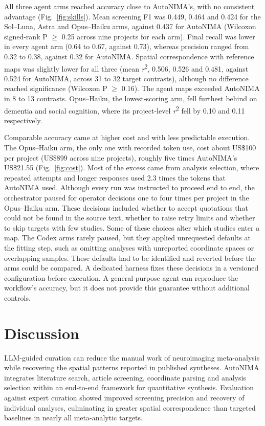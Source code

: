 All three agent arms reached accuracy close to AutoNIMA's, with no consistent advantage (Fig.~\ref{fig:skills}). Mean screening F1 was 0.449, 0.464 and 0.424 for the Sol--Luna, Astra and Opus--Haiku arms, against 0.437 for AutoNIMA (Wilcoxon signed-rank P $\geq$ 0.25 across nine projects for each arm). Final recall was lower in every agent arm (0.64 to 0.67, against 0.73), whereas precision ranged from 0.32 to 0.38, against 0.32 for AutoNIMA. Spatial correspondence with reference maps was slightly lower for all three (mean \emph{r}\textsuperscript{2}, 0.506, 0.526 and 0.481, against 0.524 for AutoNIMA, across 31 to 32 target contrasts), although no difference reached significance (Wilcoxon P $\geq$ 0.16). The agent maps exceeded AutoNIMA in 8 to 13 contrasts. Opus--Haiku, the lowest-scoring arm, fell furthest behind on dementia and social cognition, where its project-level \emph{r}\textsuperscript{2} fell by 0.10 and 0.11 respectively.

Comparable accuracy came at higher cost and with less predictable execution. The Opus--Haiku arm, the only one with recorded token use, cost about US\$100 per project (US\$899 across nine projects), roughly five times AutoNIMA's US\$21.55 (Fig.~\ref{fig:cost}). Most of the excess came from analysis selection, where repeated attempts and longer responses used 2.3 times the tokens that AutoNIMA used. Although every run was instructed to proceed end to end, the orchestrator paused for operator decisions one to four times per project in the Opus--Haiku arm. These decisions included whether to accept quotations that could not be found in the source text, whether to raise retry limits and whether to skip targets with few studies. Some of these choices alter which studies enter a map. The Codex arms rarely paused, but they applied unrequested defaults at the fitting step, such as omitting analyses with unreported coordinate spaces or overlapping samples. These defaults had to be identified and reverted before the arms could be compared. A dedicated harness fixes these decisions in a versioned configuration before execution. A general-purpose agent can reproduce the workflow's accuracy, but it does not provide this guarantee without additional controls.

\section{Discussion}

LLM-guided curation can reduce the manual work of neuroimaging meta-analysis while recovering the spatial patterns reported in published syntheses. AutoNIMA integrates literature search, article screening, coordinate parsing and analysis selection within an end-to-end framework for quantitative synthesis. Evaluation against expert curation showed improved screening precision and recovery of individual analyses, culminating in greater spatial correspondence than targeted baselines in nearly all meta-analytic targets.

